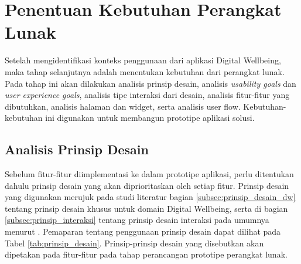 \section{Penentuan Kebutuhan Perangkat Lunak}

Setelah mengidentifikasi konteks penggunaan dari aplikasi Digital Wellbeing, maka tahap selanjutnya adalah menentukan kebutuhan dari perangkat lunak. Pada tahap ini akan dilakukan analisis prinsip desain, analisis \textit{usability goals} dan \textit{user experience goals}, analisis tipe interaksi dari desain, analisis fitur-fitur yang dibutuhkan, analisis halaman dan widget, serta analisis user flow. Kebutuhan-kebutuhan ini digunakan untuk membangun prototipe aplikasi solusi.

\subsection{Analisis Prinsip Desain}
Sebelum fitur-fitur diimplementasi ke dalam prototipe aplikasi, perlu ditentukan dahulu prinsip desain yang akan diprioritaskan oleh setiap fitur. Prinsip desain yang digunakan merujuk pada studi literatur bagian \ref{subsec:prinsip_desain_dw} tentang prinsip desain khusus untuk domain Digital Wellbeing, serta di bagian \ref{subsec:prinsip_interaksi} tentang prinsip desain interaksi pada umumnya menurut \textcite{PreeceRogersSharp15}. Pemaparan tentang penggunaan prinsip desain dapat dilihat pada Tabel \ref{tab:prinsip_desain}. Prinsip-prinsip desain yang disebutkan akan dipetakan pada fitur-fitur pada tahap perancangan prototipe perangkat lunak.

